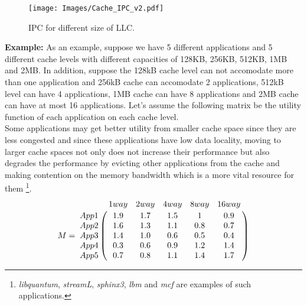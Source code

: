 \begin{figure*}[!tb]
\centering
\texttt{[image: Images/Cache\_IPC\_v2.pdf]}
\caption{IPC for different size of LLC.}\label{fig:Cache_IPC}  
\end{figure*}
\indent \textbf{Example:} As an example, suppose we have 5 different applications and 5 different cache levels with different capacities of 128KB, 256KB, 512KB, 1MB and 2MB. In addition, suppose the 128kB cache level can not accomodate more than one application and 256kB cache can accomodate 2 applications, 512kB level can have 4 applications, 1MB cache can have 8 applications and 2MB cache can have at most 16 applications. Let's assume the following matrix be the utility function of each application on each cache level. \\
\indent Some applications may get better utility from smaller cache space since they are less congested and since these applications have low data locality, moving to larger cache spaces not only does not increase their performance but also degrades the performance by evicting other applications from the cache and making contention on the memory bandwidth which is a more vital resource for them \footnote{\textit{libquantum}, \textit{streamL}, \textit{sphinx3}, \textit{lbm} and \textit{mcf} are examples of such applications.}.  \\
\begin{equation}
M = \bordermatrix{~ & 1way & 2way & 4way & 8way & 16way \cr
  App1 & 1.9 & 1.7 & 1.5 & 1 & 0.9 \cr
  App2 & 1.6 & 1.3 & 1.1 & 0.8 & 0.7 \cr
  App3 & 1.4 & 1.0 & 0.6 & 0.5 & 0.4 \cr
  App4 & 0.3 & 0.6 & 0.9 & 1.2 & 1.4 \cr
  App5 & 0.7 & 0.8 & 1.1 & 1.4 & 1.7 \cr}
\end{equation}
